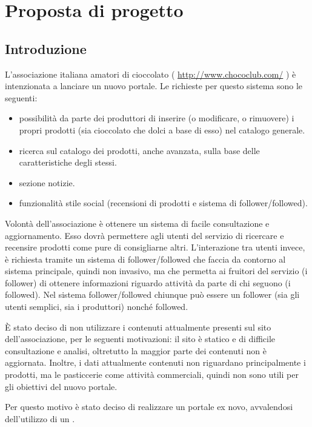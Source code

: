 \chapter{Proposta di progetto}

\section{Introduzione}
L’associazione italiana amatori di cioccolato ( \url{http://www.chococlub.com/} ) è intenzionata a lanciare un nuovo portale. 
Le richieste per questo sistema sono le seguenti:
\begin{itemize}
	\item possibilità da parte dei produttori di inserire (o modificare, o rimuovere) i propri prodotti (sia cioccolato che dolci a base di esso) nel catalogo generale.

	\item ricerca sul catalogo dei prodotti, anche avanzata, sulla base delle caratteristiche degli stessi.

	\item sezione notizie.

	\item funzionalità stile social (recensioni di prodotti e sistema di follower/followed).
\end{itemize}
Volontà dell'associazione è ottenere un sistema di facile consultazione e aggiornamento.
Esso dovrà permettere agli utenti del servizio di ricercare e recensire prodotti come pure di consigliarne altri.
L'interazione tra utenti invece, è richiesta tramite un sistema di follower/followed che faccia da contorno al sistema principale, quindi non invasivo, ma che permetta ai fruitori del servizio (i follower) di ottenere informazioni riguardo attività da parte di chi seguono (i followed).
Nel sistema follower/followed chiunque può essere un follower (sia gli utenti semplici, sia i produttori) nonché followed.
 
È stato deciso di non utilizzare i contenuti attualmente presenti sul sito dell’associazione, per le seguenti motivazioni: il sito è statico e di difficile consultazione e analisi, oltretutto la maggior parte dei contenuti non è aggiornata. Inoltre, i dati attualmente contenuti non riguardano principalmente i prodotti, ma le pasticcerie come attività commerciali, quindi non sono utili per gli obiettivi del nuovo portale.
 
Per questo motivo è stato deciso di realizzare un portale ex novo, avvalendosi dell’utilizzo di un .

